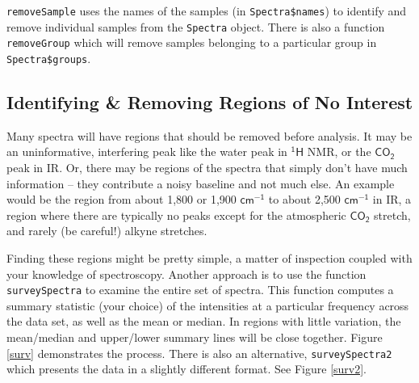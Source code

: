\documentclass[letter,10pt,twocolumn,twoside,printwatermark=false]{pinp}
\begin{document}
\texttt{removeSample} uses the names of the samples (in
\texttt{Spectra\$names}) to identify and remove individual samples from
the \texttt{Spectra} object. There is also a function
\texttt{removeGroup} which will remove samples belonging to a particular
group in \texttt{Spectra\$groups}.

\hypertarget{identifying-removing-regions-of-no-interest}{%
\subsection{Identifying \& Removing Regions of No
Interest}\label{identifying-removing-regions-of-no-interest}}

Many spectra will have regions that should be removed before analysis.
It may be an uninformative, interfering peak like the water peak in
\(\mathsf{^{1}H}\) NMR, or the \(\mathsf{CO_2}\) peak in IR. Or, there
may be regions of the spectra that simply don't have much information --
they contribute a noisy baseline and not much else. An example would be
the region from about 1,800 or 1,900 \(\mathsf{cm^{-1}}\) to about 2,500
\(\mathsf{cm^{-1}}\) in IR, a region where there are typically no peaks
except for the atmospheric \(\mathsf{CO_2}\) stretch, and rarely (be
careful!) alkyne stretches.

Finding these regions might be pretty simple, a matter of inspection
coupled with your knowledge of spectroscopy. Another approach is to use
the function \texttt{surveySpectra} to examine the entire set of
spectra. This function computes a summary statistic (your choice) of the
intensities at a particular frequency across the data set, as well as
the mean or median. In regions with little variation, the mean/median
and upper/lower summary lines will be close together. Figure \ref{surv}
demonstrates the process. There is also an alternative,
\texttt{surveySpectra2} which presents the data in a slightly different
format. See Figure \ref{surv2}.

\begin{Shaded}
\begin{Highlighting}[]
   \NormalTok{,}
   \NormalTok{)}
\end{Highlighting}
\end{Shaded}
\end{document}
